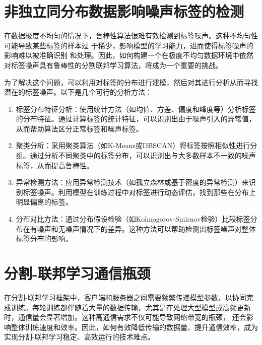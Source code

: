 \section{非独立同分布数据影响噪声标签的检测}
在数据极度不均匀的情况下，鲁棒性算法很难有效检测到标签噪声。这种不均匀性可能导致某些标签的样本过
于稀少，影响模型的学习能力，进而使得标签噪声的影响难以被准确识别
和处理。因此，如何构建一个在极度不均匀数据环境中依然对标签噪声具有鲁棒性的分割联邦学习算法，将成为一个重要的挑战。

为了解决这个问题，可以利用对标签的分布进行建模，然后对其进行分析从而寻找潜在的标签噪声。以下是几个可行的分析方法：
\begin{enumerate}

    \item 标签分布特征分析：使用统计方法（如均值、方差、偏度和峰度等）分析标签的分布特征。通过计算标签的统计特征，可以识别出由于噪声引入的异常值，从而帮助算法区分正常标签和噪声标签。

    \item 聚类分析：采用聚类算法（如K-Means或DBSCAN）将标签按照相似性进行分组。通过分析不同聚类中的标签分布，可以识别出与大多数样本不一致的噪声标签，从而提高鲁棒性。

    \item 异常检测方法：应用异常检测技术（如孤立森林或基于密度的异常检测）来识别标签噪声。利用模型在训练过程中对标签进行动态评估，找到那些在分布上明显偏离的标签。

    \item 分布对比方法：通过分布假设检验（如Kolmogorov-Smirnov检验）比较标签分布在有噪声和无噪声情况下的差异。这种方法可以帮助检测出标签噪声对整体标签分布的影响。

\end{enumerate}

\section{分割-联邦学习通信瓶颈}
在分割-联邦学习框架中，客户端和服务器之间需要频繁传递模型参数，以协同完成训练。每轮训练都伴随着大量的数据传输，尤其是在处理大型模型或高频更新时，通信量会显著增加。这种高通信需求不仅可能导致网络带宽的瓶颈，
还会影响整体训练速度和效率。因此，如何有效降低传输的数据量、提升通信效率，成为实现分割-联邦学习稳定、高效运行的技术难点。

